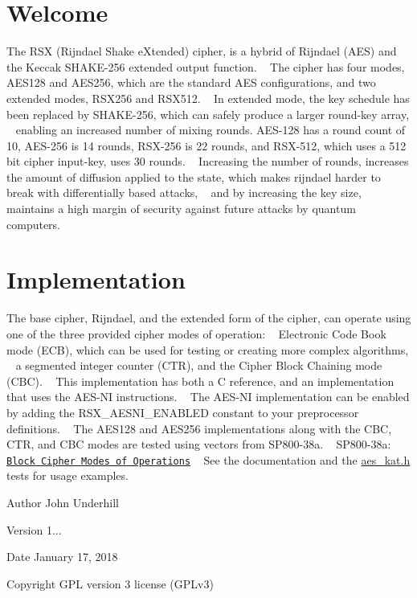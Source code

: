 \hypertarget{index_intro_sec}{}\section{Welcome}\label{index_intro_sec}
The R\+S\+X (Rijndael Shake e\+Xtended) cipher, is a hybrid of Rijndael (A\+E\+S) and the Keccak S\+H\+A\+K\+E-\/256 extended output function. ~\newline
The cipher has four modes, A\+E\+S128 and A\+E\+S256, which are the standard A\+E\+S configurations, and two extended modes, R\+S\+X256 and R\+S\+X512. ~\newline
In extended mode, the key schedule has been replaced by S\+H\+A\+K\+E-\/256, which can safely produce a larger round-\/key array, ~\newline
enabling an increased number of mixing rounds. A\+E\+S-\/128 has a round count of 10, A\+E\+S-\/256 is 14 rounds, R\+S\+X-\/256 is 22 rounds, and R\+S\+X-\/512, which uses a 512 bit cipher input-\/key, uses 30 rounds. ~\newline
Increasing the number of rounds, increases the amount of diffusion applied to the state, which makes rijndael harder to break with differentially based attacks, ~\newline
and by increasing the key size, maintains a high margin of security against future attacks by quantum computers.\hypertarget{index_Implementation}{}\section{Implementation}\label{index_Implementation}
The base cipher, Rijndael, and the extended form of the cipher, can operate using one of the three provided cipher modes of operation\+: ~\newline
Electronic Code Book mode (E\+C\+B), which can be used for testing or creating more complex algorithms, ~\newline
a segmented integer counter (C\+T\+R), and the Cipher Block Chaining mode (C\+B\+C). ~\newline
This implementation has both a C reference, and an implementation that uses the A\+E\+S-\/\+N\+I instructions. ~\newline
The A\+E\+S-\/\+N\+I implementation can be enabled by adding the R\+S\+X\+\_\+\+A\+E\+S\+N\+I\+\_\+\+E\+N\+A\+B\+L\+E\+D constant to your preprocessor definitions. ~\newline
The A\+E\+S128 and A\+E\+S256 implementations along with the C\+B\+C, C\+T\+R, and C\+B\+C modes are tested using vectors from S\+P800-\/38a. ~\newline
S\+P800-\/38a\+: \href{http://nvlpubs.nist.gov/nistpubs/Legacy/SP/nistspecialpublication800-38a.pdf}{\tt Block Cipher Modes of Operations} ~\newline
See the documentation and the \hyperlink{aes__kat_8h}{aes\+\_\+kat.\+h} tests for usage examples.

\begin{DoxyAuthor}{Author}
John Underhill 
\end{DoxyAuthor}
\begin{DoxyVersion}{Version}
1... 
\end{DoxyVersion}
\begin{DoxyDate}{Date}
January 17, 2018 
\end{DoxyDate}
\begin{DoxyCopyright}{Copyright}
G\+P\+L version 3 license (G\+P\+Lv3) 
\end{DoxyCopyright}
